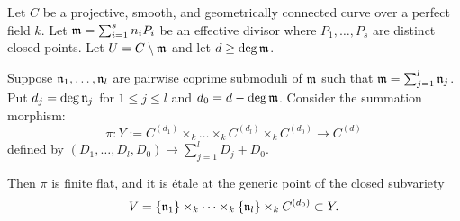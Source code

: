 \begin{lemma}\label{lemma:takeuchi_lemma}
     Let $C$ be a projective, smooth, and geometrically connected curve over a perfect field $k$.
     Let $\mathfrak{m} = \sum_{i=1}^{s} n_i P_i$ be an effective divisor where $P_1, \dots, P_s$ are distinct closed points.
     Let $U = C \setminus \mathfrak{m}$ and let $d \geq \deg \mathfrak{m}$.

     Suppose $\mathfrak{n}_1, \dots, \mathfrak{n}_l$ are pairwise coprime submoduli of $\mathfrak{m}$ such that $\mathfrak{m} = \sum_{j=1}^l \mathfrak{n}_j$.
     Put $d_j=\deg\mathfrak{n}_j$ for $1\leq j\leq l$ and $d_0=d-\deg\mathfrak{m}$.
     Consider the summation morphism:
     \[
     \pi : Y:=C^{(d_1)} \times_k \dots \times_k C^{(d_l)} \times_k C^{(d_0)} \longrightarrow C^{(d)}
     \]
     defined by $(D_1, \dots, D_l, D_0) \mapsto \sum_{j=1}^l D_j + D_0$.

     Then $\pi$ is finite flat, and it is étale at the generic point of the closed subvariety
     \[
     V = \{\mathfrak{n}_1\} \times_k \dots \times_k \{\mathfrak{n}_l\} \times_k C^{(d_0)}\subset Y.
     \]
\end{lemma}

